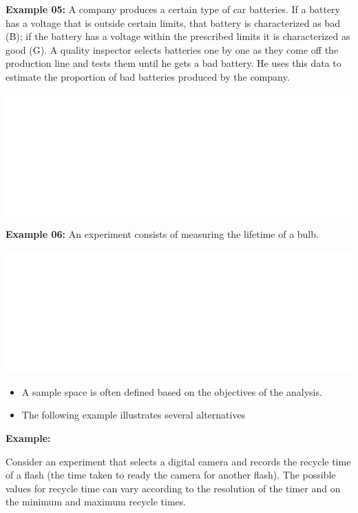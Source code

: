\documentclass[]{book}
\providecommand{\tightlist}{%
  \setlength{\itemsep}{0pt}\setlength{\parskip}{0pt}}
\begin{document}
\textbf{Example 05:} A company produces a certain type of car batteries. If a battery has a voltage that is outside certain limits, that battery is characterized as bad (B); if the battery has a voltage within the prescribed limits it is characterized as good (G). A quality inspector selects batteries one by one as they come off the production line and tests them until he gets a bad battery. He uses this data to estimate the proportion of bad batteries produced by the company.

\begin{center}\includegraphics[width=1\linewidth]{figure/box71e-1} \end{center}

\textbf{Example 06:} An experiment consists of measuring the lifetime of a bulb.

\begin{center}\includegraphics[width=1\linewidth]{figure/box71f-1} \end{center}

\begin{itemize}
\tightlist
\item
  A sample space is often defined based on the objectives of the analysis.
\item
  The following example illustrates several alternatives
\end{itemize}

\textbf{Example:}

Consider an experiment that selects a digital camera and records the recycle time of a flash (the time taken to ready the camera for another flash). The possible values for recycle time can vary according to the resolution of the timer and on the minimum and maximum recycle times.
\end{document}
